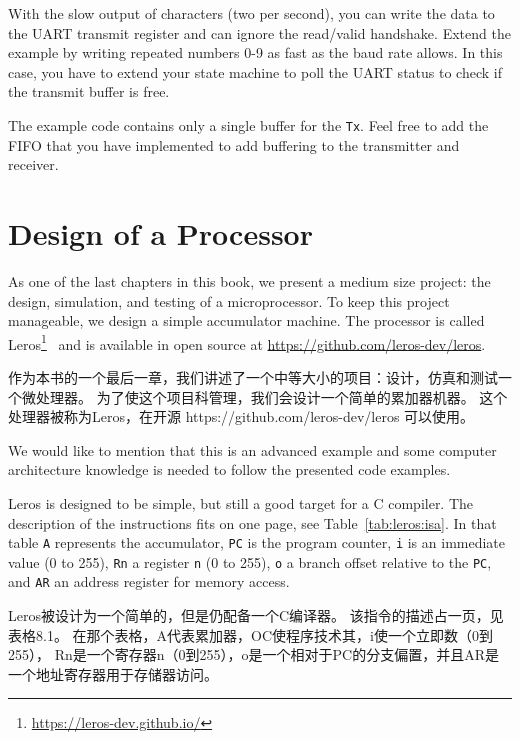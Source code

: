 \documentclass[%
    10pt,
    headinclude, footexclude,
    openright, %
    notitlepage,
    cleardoubleempty,
    headsepline,
    pointlessnumbers,
    bibtotoc, idxtotoc,
    ]{scrbook}
\newcommand{\code}[1]{{\small{\texttt{#1}}}}
\newcommand{\myref}[2]{\href{#1}{#2}}
\renewcommand{\myref}[2]{{#2}{\footnote{\url{#1}}}}
\begin{document}
With the slow output of characters (two per second), you can write the data
to the UART transmit register and can ignore the read/valid handshake.
Extend the example by writing repeated numbers 0-9 as fast as the baud rate allows.
In this case, you have to extend your state machine to poll the UART status
to check if the transmit buffer is free.

The example code contains only a single buffer for the \code{Tx}. Feel free to
add the FIFO that you have implemented to add buffering to the transmitter
and receiver. 

\chapter{Design of a Processor}

As one of the last chapters in this book, we present a medium size project:
the design, simulation, and testing of a microprocessor.
To keep this project manageable, we design a simple accumulator machine.
The processor is called \myref{https://leros-dev.github.io/}{Leros}~\cite{leros:arcs2019}
and is available in open source at \url{https://github.com/leros-dev/leros}.

作为本书的一个最后一章，我们讲述了一个中等大小的项目：设计，仿真和测试一个微处理器。
为了使这个项目科管理，我们会设计一个简单的累加器机器。
这个处理器被称为Leros，在开源 https://github.com/leros-dev/leros 可以使用。

We would like to mention that this is an advanced example and some computer
architecture knowledge is needed to follow the presented code examples.

Leros is designed to be simple, but still a good target for a C compiler.
The description of the instructions fits on one page, see Table~\ref{tab:leros:isa}.
In that table \code{A} represents the accumulator, \code{PC} is the program counter,
\code{i} is an immediate value (0 to 255), \code{Rn} a register
\code{n} (0 to 255), \code{o} a branch offset relative to the \code{PC},
and \code{AR} an address register for memory access.

Leros被设计为一个简单的，但是仍配备一个C编译器。
该指令的描述占一页，见表格8.1。
在那个表格，A代表累加器，OC使程序技术其，i使一个立即数（0到255）， Rn是一个寄存器n（0到255），o是一个相对于PC的分支偏置，并且AR是一个地址寄存器用于存储器访问。
\end{document}
